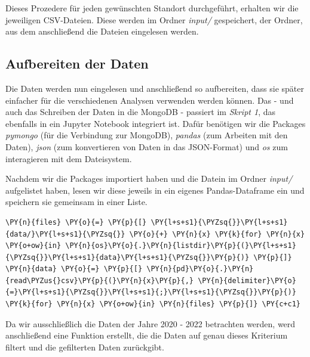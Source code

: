 Dieses Prozedere für jeden gewünschten Standort durchgeführt, erhalten wir die jeweiligen CSV-Dateien. Diese werden im Ordner \emph{input/} gespeichert, der Ordner, aus dem anschließend die Dateien eingelesen werden.

\subsection{Aufbereiten der Daten}
Die Daten werden nun eingelesen und anschließend so aufbereiten, dass sie später einfacher für die verschiedenen Analysen verwenden werden können. Das - und auch das Schreiben der Daten in die MongoDB - passiert im \emph{Skript 1}, das ebenfalls in ein Jupyter Notebook integriert ist. Dafür benötigen wir die Packages \emph{pymongo} (für die Verbindung zur MongoDB), \emph{pandas} (zum Arbeiten mit den Daten), \emph{json} (zum konvertieren von Daten in das JSON-Format) und \emph{os} zum interagieren mit dem Dateisystem.
\bigbreak

Nachdem wir die Packages importiert haben und die Datein im Ordner \emph{input/} aufgelistet haben, lesen wir diese jeweils in ein eigenes Pandas-Dataframe ein und speichern sie gemeinsam in einer Liste.

\bigbreak
\begin{tcolorbox}[breakable, size=fbox, boxrule=1pt, pad at break*=1mm,colback=cellbackground, colframe=cellborder]
\begin{Verbatim}[commandchars=\\\{\}]
\PY{n}{files} \PY{o}{=} \PY{p}{[} \PY{l+s+s1}{\PYZsq{}}\PY{l+s+s1}{data/}\PY{l+s+s1}{\PYZsq{}} \PY{o}{+} \PY{n}{x} \PY{k}{for} \PY{n}{x} \PY{o+ow}{in} \PY{n}{os}\PY{o}{.}\PY{n}{listdir}\PY{p}{(}\PY{l+s+s1}{\PYZsq{}}\PY{l+s+s1}{data}\PY{l+s+s1}{\PYZsq{}}\PY{p}{)} \PY{p}{]}
\PY{n}{data} \PY{o}{=} \PY{p}{[} \PY{n}{pd}\PY{o}{.}\PY{n}{read\PYZus{}csv}\PY{p}{(}\PY{n}{x}\PY{p}{,} \PY{n}{delimiter}\PY{o}{=}\PY{l+s+s1}{\PYZsq{}}\PY{l+s+s1}{;}\PY{l+s+s1}{\PYZsq{}}\PY{p}{)} \PY{k}{for} \PY{n}{x} \PY{o+ow}{in} \PY{n}{files} \PY{p}{]} \PY{c+c1}
\end{Verbatim}
\end{tcolorbox}
\bigbreak

Da wir ausschließlich die Daten der Jahre 2020 - 2022 betrachten werden, werd anschließend eine Funktion erstellt, die die Daten auf genau dieses Kriterium filtert und die gefilterten Daten zurückgibt.

